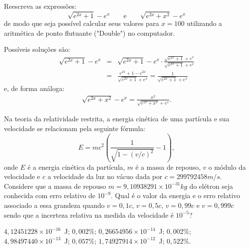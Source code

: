 

\begin{exer} Reescreva as expressões:
  \begin{equation} \sqrt{e^{2x}+1}-e^x \qquad\text{e}\qquad \sqrt{e^{2x}+x^2}-e^x  \end{equation}
  de modo que seja possível calcular seus valores para $x=100$ utilizando a aritmética de ponto flutuante ("Double") no computador.
\end{exer}
\begin{resp}
 Possíveis soluções são:
 \begin{eqnarray}
  \sqrt{e^{2x}+1}-e^x &=& \sqrt{e^{2x}+1}-e^x \cdot \frac{\sqrt{e^{2x}+1}+e^x }{\sqrt{e^{2x}+1}+e^x }\\
&=&  \frac{e^{2x}+1-e^{2x} }{\sqrt{e^{2x}+1}+e^x }= \frac{1}{\sqrt{e^{2x}+1}+e^x }
 \end{eqnarray}
e, de forma análoga:
 \begin{eqnarray}
  \sqrt{e^{2x}+x^2}-e^x = \frac{x^2}{\sqrt{e^{2x}+x^2}+e^x}.
 \end{eqnarray}
\end{resp}


\begin{exer} Na teoria da relatividade restrita, a energia cinética de uma partícula e sua velocidade se relacionam pela seguinte fórmula:
  \begin{equation}
    E=mc^2\left(\frac{1}{\sqrt{1-(v/c)^2}}-1\right),
  \end{equation}
onde $E$ é a energia cinética da partícula, $m$ é a massa de repouso, $v$ o módulo da velocidade e $c$ a velocidade da luz no vácuo dada por $c=299792458 m/s$. Considere que a massa de repouso $m=9,10938291\times 10^{-31} kg$ do elétron seja conhecida com erro relativo de $10^{-9}$. Qual é o valor da energia e o erro relativo associado a essa grandeza quando $v=0,1 c$, $v=0,5 c$, $v=0,99c$ e $v=0,999c$ sendo que a incerteza relativa na medida da velocidade é $10^{-5}$?
\end{exer}
\begin{resp}
    $4,12451228\times 10^{-16}$~J; $0,002\%$; $0,26654956\times 10^{-14}$~J; $0,002\%$; $4,98497440\times 10^{-13}$~J; $0,057\%$; $1,74927914\times 10^{-12}$~J; $0,522\%$.
\end{resp}

%
